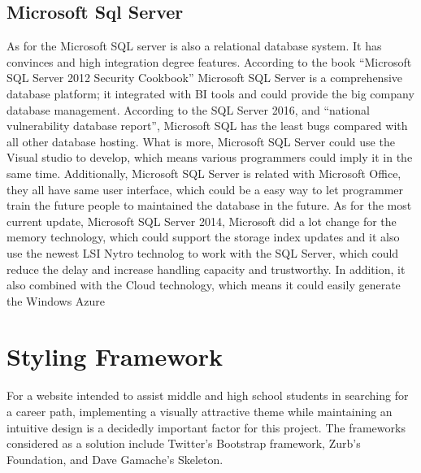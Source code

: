 \documentclass[letterpaper,10pt, draftclsnofoot,onecolumn]{IEEEtran}
\begin{document}
{{{{{{\subsection[Microsoft Sql Server]{\color{black}
Microsoft Sql Server}
{\color{black}\normalsize\noindent
{As for the Microsoft SQL server is also a relational database system. It has convinces and high integration degree features.
According to the book “Microsoft SQL Server 2012 Security Cookbook”\cite{IEEEexample:book5} Microsoft SQL Server is a comprehensive database platform; it integrated with BI tools and could provide the big company database management.
According to the SQL Server 2016, and “national vulnerability database report”, Microsoft SQL has the least bugs compared with all other database hosting. What is more, Microsoft SQL Server could use the Visual studio to develop, which means various programmers could imply it in the same time. 
Additionally, Microsoft SQL Server is related with Microsoft Office, they all have same user interface, which could be a easy way to let programmer train the future people to maintained the database in the future. As for the most current update, Microsoft SQL Server 2014, Microsoft did a lot change for the memory technology, which could support the storage index updates and it also use the newest LSI Nytro technolog to work with the SQL Server, which could reduce the delay and increase handling capacity and trustworthy. 
In addition, it also combined with the Cloud technology, which means it could easily generate the Windows Azure
}


\section[Styling Framework]{\color{black}
Styling Framework}
{\color{black}\normalsize\noindent
{For a website intended to assist middle and high school students in searching for a career path, implementing a visually attractive theme while maintaining an intuitive design is a decidedly important factor for this project. The frameworks considered as a solution include Twitter's Bootstrap framework, Zurb's Foundation, and Dave Gamache's Skeleton.}

}}}}}}}}
\end{document}
